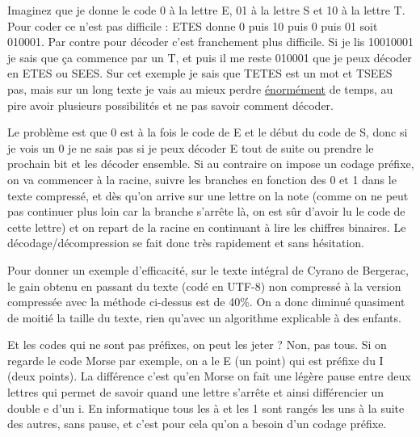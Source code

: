 \documentclass[a4paper,10pt]{article}
\begin{document}
Imaginez que je donne le code 0 à la lettre E, 01 à la lettre S  et 10
à la lettre T. Pour coder ce n'est pas difficile : ETES donne 0 puis
10 puis 0 puis 01 soit 010001. Par contre pour décoder c'est
franchement plus difficile. Si je lis 10010001 je sais que ça commence
par un T, et puis il me reste 010001 que je peux décoder en ETES ou
SEES. Sur cet exemple je sais que TETES est un mot et TSEES pas, mais
sur un long texte je vais au mieux perdre \underline{énormément} de
temps, au pire avoir plusieurs possibilités et ne pas savoir comment
décoder. 

Le problème est que 0 est à la fois le code de E et le début du code
de S, donc si je vois un 0 je ne sais pas si je peux décoder E tout de
suite ou prendre le prochain bit et les décoder ensemble. Si au
contraire on impose un codage préfixe, on va commencer à la racine,
suivre les branches en fonction des 0 et 1 dans le texte compressé, et
dès qu'on arrive sur une lettre on la note (comme on ne peut pas
continuer plus loin car la branche s'arrête là, on est sûr d'avoir lu le
code de cette lettre) et on repart de la racine en continuant à lire
les chiffres binaires. Le décodage/décompression se fait donc très
rapidement et sans hésitation.
 
Pour donner un exemple d'efficacité, sur le texte intégral de Cyrano
de Bergerac, le gain obtenu en passant du texte (codé en UTF-8) non
compressé à la version compressée avec la méthode ci-dessus est de
40\%. On a donc diminué quasiment de moitié la taille du texte, rien
qu'avec un algorithme explicable à des enfants. 

Et les codes qui ne sont pas préfixes, on peut les jeter ? Non, pas
tous. Si on regarde le code Morse par exemple, on a le E (un point)
qui est préfixe du I (deux points). La différence c'est qu'en Morse on
fait une légère pause entre deux lettres qui permet de savoir quand
une lettre s'arrête et ainsi différencier un double e d'un i. En
informatique tous les à et les 1 sont rangés les uns à la suite des
autres, sans pause, et c'est pour cela qu'on a besoin d'un codage préfixe.

\end{document}

